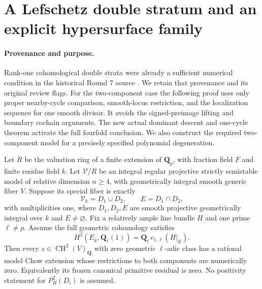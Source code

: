 \section{A Lefschetz double stratum and an explicit hypersurface family}
\label{r16tb:section}

\paragraph{Provenance and purpose.}
Rank-one cohomological double strata were already a sufficient
numerical condition in the historical Round 7 source
.
We retain that provenance and its original review flags.
For the two-component case the following proof uses only proper
nearby-cycle comparison, smooth-locus restriction, and the
localization sequence for one smooth divisor. It avoids the
signed-preimage lifting and boundary cochain arguments. The new
actual dominant descent and one-cycle theorem activate the full
fourfold conclusion. We also construct the required two-component
model for a precisely specified polynomial degeneration.

\begin{lemma}
\label{r16tb:numerical}
Let $R$ be the valuation ring of a finite extension of $\mathbf Q_p$,
with fraction field $F$ and finite residue field $k$. Let
$\mathcal V/R$ be an integral regular projective strictly semistable
model of relative dimension $n\geq4$, with geometrically integral
smooth generic fiber $V$. Suppose its special fiber is exactly
\[
                   \mathcal V_k=D_1\cup D_2,
                   \qquad E=D_1\cap D_2,
 \tag{TB16.1}\label{r16tb:model}
\]
with multiplicities one, where $D_1,D_2,E$ are smooth projective
geometrically integral over $k$ and $E\ne\varnothing$.
Fix a relatively ample line bundle $H$ and one prime $\ell\ne p$.
Assume the full geometric cohomology satisfies
\[
 H^2(E_{\bar k},\mathbf Q_\ell(1))
          =\mathbf Q_\ell\,c_{1,\ell}(H|_E).
 \tag{TB16.2}\label{r16tb:rank-one}
\]
Then every $z\in\operatorname{CH}^2(V)_{\mathbf Q}$ with zero
geometric $\ell$-adic class has a rational model Chow extension
whose restrictions to both components are numerically zero.
Equivalently its frozen canonical primitive residual is zero.
No positivity statement for $P_H^2(D_i)$ is assumed.
\end{lemma}

